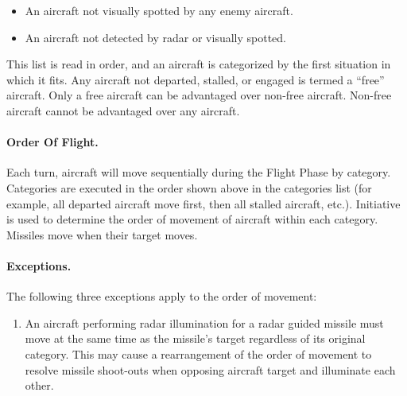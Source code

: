 {\begin{itemize}
    \item{} An aircraft not visually spotted by any enemy aircraft.

    \item{} An aircraft not detected by radar or visually spotted.

\end{itemize}

\AX{
    
}

This list is read in order, and an aircraft is categorized by the first situation in which it fits. Any aircraft not departed, stalled, or engaged is termed a “free” aircraft. Only a free aircraft can be advantaged over non-free aircraft. Non-free aircraft cannot be advantaged over any aircraft.



\paragraph{Order Of Flight.} Each turn, aircraft will move sequentially during the Flight Phase by category. Categories are executed in the order shown above in the categories list (for example, all departed aircraft move first, then all stalled aircraft, etc.). Initiative is used to determine the order of movement of aircraft within each category. Missiles move when their target moves.

\paragraph{Exceptions.} The following three exceptions apply to the order of movement:

\begin{enumerate}

    \item{} An aircraft performing radar illumination for a radar guided missile must move at the same time as the missile's target regardless of its original category. This may cause a rearrangement of the order of movement to resolve missile shoot-outs when opposing aircraft target and illuminate each other.


\end{enumerate}}
